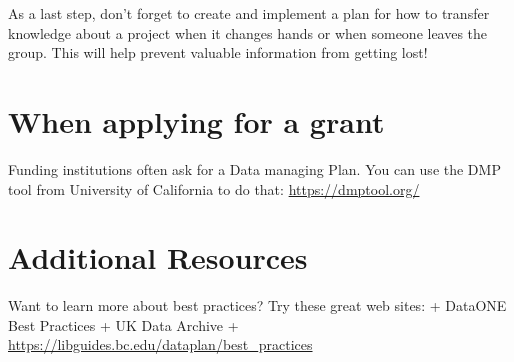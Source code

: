 \documentclass[
]{book}
\begin{document}
As a last step, don't forget to create and implement a plan for how to transfer knowledge about a project when it changes hands or when someone leaves the group. This will help prevent valuable information from getting lost!

\hypertarget{when-applying-for-a-grant}{%
\section{When applying for a grant}\label{when-applying-for-a-grant}}

Funding institutions often ask for a Data managing Plan. You can use the DMP tool from University of California to do that: \url{https://dmptool.org/}

\hypertarget{additional-resources}{%
\section{Additional Resources}\label{additional-resources}}

Want to learn more about best practices? Try these great web sites:
+ DataONE Best Practices
+ UK Data Archive
+ \url{https://libguides.bc.edu/dataplan/best_practices}

  
\end{document}
